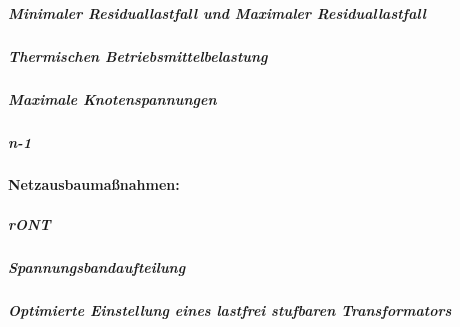 
\subparagraph{Minimaler Residuallastfall und Maximaler Residuallastfall}

\subparagraph{Thermischen Betriebsmittelbelastung}

\subparagraph{Maximale Knotenspannungen}


\subparagraph{n-1}

\paragraph{Netzausbaumaßnahmen:}


\subparagraph{rONT}



\subparagraph{Spannungsbandaufteilung}

\subparagraph{Optimierte Einstellung eines lastfrei stufbaren Transformators}